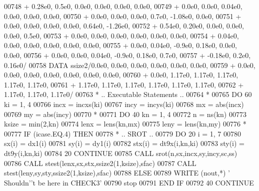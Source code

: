\begin{DoxyCode}
00748      +                  0.28e0, 0.5e0, 0.0e0, 0.0e0, 0.0e0, 0.0e0,
00749      +                  0.0e0, 0.0e0, 0.04e0, 0.0e0, 0.0e0, 0.0e0,
00750      +                  0.0e0, 0.0e0, 0.0e0, 0.7e0, -1.08e0, 0.0e0,
00751      +                  0.0e0, 0.0e0, 0.0e0, 0.0e0, 0.64e0, -1.26e0,
00752      +                  0.54e0, 0.20e0, 0.0e0, 0.0e0, 0.0e0, 0.5e0,
00753      +                  0.0e0, 0.0e0, 0.0e0, 0.0e0, 0.0e0, 0.0e0,
00754      +                  0.04e0, 0.0e0, 0.0e0, 0.0e0, 0.0e0, 0.0e0,
00755      +                  0.0e0, 0.04e0, -0.9e0, 0.18e0, 0.0e0, 0.0e0,
00756      +                  0.0e0, 0.0e0, 0.04e0, -0.9e0, 0.18e0, 0.7e0,
00757      +                  -0.18e0, 0.2e0, 0.16e0/
00758       \textcolor{keyword}{DATA}              ssize2/0.0e0, 0.0e0, 0.0e0, 0.0e0, 0.0e0, 0.0e0,
00759      +                  0.0e0, 0.0e0, 0.0e0, 0.0e0, 0.0e0, 0.0e0, 0.0e0,
00760      +                  0.0e0, 1.17e0, 1.17e0, 1.17e0, 1.17e0, 1.17e0,
00761      +                  1.17e0, 1.17e0, 1.17e0, 1.17e0, 1.17e0, 1.17e0,
00762      +                  1.17e0, 1.17e0, 1.17e0/
00763 \textcolor{comment}{*     .. Executable Statements ..}
00764 \textcolor{comment}{*}
00765       \textcolor{keywordflow}{DO} 60 ki = 1, 4
00766          incx = incxs(ki)
00767          incy = incys(ki)
00768          mx = abs(incx)
00769          my = abs(incy)
00770 \textcolor{comment}{*}
00771          \textcolor{keywordflow}{DO} 40 kn = 1, 4
00772             n = ns(kn)
00773             ksize = min(2,kn)
00774             lenx = lens(kn,mx)
00775             leny = lens(kn,my)
00776 \textcolor{comment}{*}
00777             \textcolor{keywordflow}{IF} (icase.EQ.4) \textcolor{keywordflow}{THEN}
00778 \textcolor{comment}{*              .. SROT ..}
00779                \textcolor{keywordflow}{DO} 20 i = 1, 7
00780                   sx(i) = dx1(i)
00781                   sy(i) = dy1(i)
00782                   stx(i) = dt9x(i,kn,ki)
00783                   sty(i) = dt9y(i,kn,ki)
00784    20          \textcolor{keywordflow}{CONTINUE}
00785                \textcolor{keyword}{CALL }srot(n,sx,incx,sy,incy,sc,ss)
00786                \textcolor{keyword}{CALL }stest(lenx,sx,stx,ssize2(1,ksize),sfac)
00787                \textcolor{keyword}{CALL }stest(leny,sy,sty,ssize2(1,ksize),sfac)
00788             \textcolor{keywordflow}{ELSE}
00789                \textcolor{keyword}{WRITE} (nout,*) \textcolor{stringliteral}{' Shouldn'}\textcolor{stringliteral}{'t be here in CHECK3'}
00790                stop
00791 \textcolor{keywordflow}{            END IF}
00792    40    \textcolor{keywordflow}{CONTINUE}

\end{DoxyCode}

